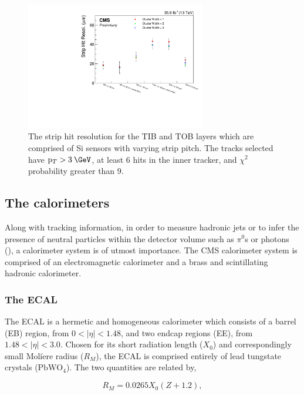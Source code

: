 \begin{figure}
  \centering
  \includegraphics[width=0.7\textwidth]{figs/StripHitRes.pdf}
  \caption{The strip hit resolution for the TIB and TOB layers which are comprised of Si sensors with varying strip pitch. The tracks selected have $\pt>3\:\GeV$, at least 6 hits in the inner tracker, and $\chi^2$ probability greater than 9.}
  \label{fig:striphitres}
\end{figure}

\subsection{The calorimeters}
\label{subsec:calos}

Along with tracking information, in order to measure hadronic jets or to infer the presence of neutral particles within the detector volume such as $\pi^{0}$s or photons (\gamma), a calorimeter system is of utmost importance. The CMS calorimeter system is comprised of an electromagnetic calorimeter and a brass and scintillating hadronic calorimeter. 

\subsubsection{The ECAL}
\label{subsubsec:ECAL}

The ECAL is a hermetic and homogeneous calorimeter which consists of a barrel (EB) region, from $0 < |\eta| < 1.48$, and two endcap regions (EE), from $1.48 < |\eta| < 3.0$. Chosen for its short radiation length ($X_0$) and correspondingly small $\textrm{Moli}\grave{\textrm{e}}\textrm{re}$ radius ($R_{M}$), the ECAL is comprised entirely of lead tungstate crystals ($\textrm{PbWO}_4$). The two quantities are related by, 

\begin{equation}
  R_{M} = 0.0265X_{0}(Z+1.2),
\end{equation}

